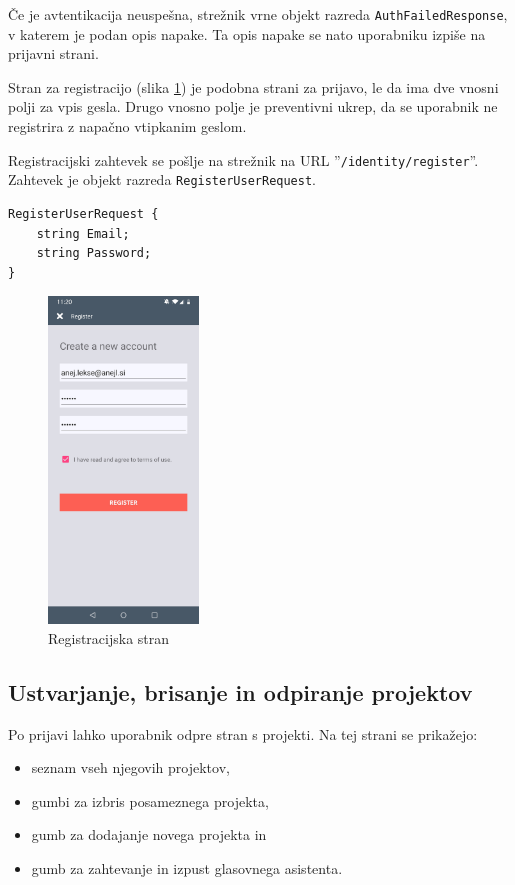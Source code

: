 \documentclass[a4paper, 12pt]{book}
\begin{document}
Če je avtentikacija neuspešna, strežnik vrne objekt razreda \texttt{AuthFailedResponse}, v katerem je podan opis napake.
Ta opis napake se nato uporabniku izpiše na prijavni strani.

Stran za registracijo (slika \ref{app_register}) je podobna strani za prijavo, le da ima dve vnosni polji za vpis gesla.
Drugo vnosno polje je preventivni ukrep, da se uporabnik ne registrira z napačno vtipkanim geslom.

Registracijski zahtevek se pošlje na strežnik na URL ''\texttt{/identity/register}''.
Zahtevek je objekt razreda \texttt{RegisterUserRequest}.

\begin{Verbatim}[commandchars=+\[\]]
RegisterUserRequest {
    string Email; 
    string Password;
}
\end{Verbatim}

\begin{figure}[H]
\begin{center}
\includegraphics[width=4cm]{app_register}
\end{center}
	\caption{Registracijska stran}
\label{app_register}
\end{figure}

\subsection{Ustvarjanje, brisanje in odpiranje projektov}

Po prijavi lahko uporabnik odpre stran s projekti.
Na tej strani se prikažejo:
\begin{itemize}
	\item seznam vseh njegovih projektov, 
	\item gumbi za izbris posameznega projekta,
	\item gumb za dodajanje novega projekta in
	\item gumb za zahtevanje in izpust glasovnega asistenta.
\end{itemize}
\end{document}
